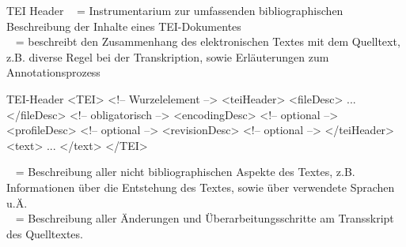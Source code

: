 \begin{frame}{TEI Header}
\footnotesize
{}~ = Instrumentarium zur umfassenden bibliographischen  Beschreibung der Inhalte eines TEI-Dokumentes  \\
~ = beschreibt den Zusammenhang des elektronischen Textes mit
dem Quelltext, z.B. diverse Regel bei der Transkription, sowie Erläuterungen zum
Annotationsprozess \\

\begin{myxml}{TEI-Header}
<TEI> <!-- Wurzelelement -->
    <teiHeader>
        <fileDesc> ... </fileDesc> <!-- obligatorisch --> 
        <encodingDesc> <!-- optional -->
        <profileDesc> <!-- optional -->
        <revisionDesc> <!-- optional -->
    </teiHeader> 
    <text> ... </text>
</TEI>
\end{myxml} 
~ = Beschreibung aller nicht bibliographischen Aspekte des
Textes, z.B. Informationen über die Entstehung des Textes, sowie über verwendete Sprachen
u.Ä. \\
~ = Beschreibung aller Änderungen und Überarbeitungsschritte am
Transskript des Quelltextes.
\end{frame}

